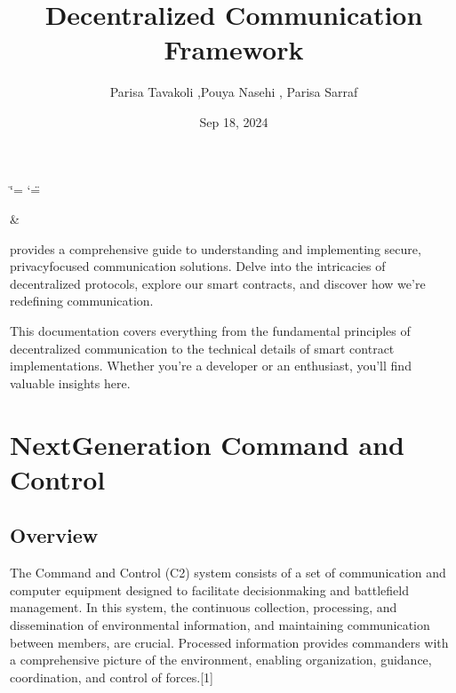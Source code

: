 \documentclass[a4paper,10pt,english]{sphinxmanual}
\title{Decentralized Communication Framework}
\date{Sep 18, 2024}
\author{Parisa Tavakoli ,Pouya Nasehi , Parisa Sarraf}
\begin{document}
\ifdefined\shorthandoff
  \ifnum\catcode`\=\string=\active\shorthandoff{=}\fi
  \ifnum\catcode`\"=\active{}\fi
\fi

\pagestyle{empty}
\sphinxmaketitle
\pagestyle{plain}
\sphinxtableofcontents
\pagestyle{normal}
\label{\detokenize{index::doc}}



\begin{savenotes}\sphinxattablestart
\sphinxthistablewithglobalstyle
\centering
\begin{tabular}[t]{}
\sphinxtoprule
\sphinxtableatstartofbodyhook
\noindent{}
&
\noindent{}
\\
\sphinxbottomrule
\end{tabular}
\sphinxtableafterendhook\par
\sphinxattableend\end{savenotes}

\sphinxAtStartPar
{}

\sphinxAtStartPar
{} provides a comprehensive guide to understanding and implementing secure, privacy\sphinxhyphen{}focused communication solutions. Delve into the intricacies of decentralized protocols, explore our smart contracts, and discover how we’re redefining communication.

\sphinxAtStartPar
{} This documentation covers everything from the fundamental principles of decentralized communication to the technical details of smart contract implementations. Whether you’re a developer or an enthusiast, you’ll find valuable insights here.

\sphinxstepscope


\chapter{Next\sphinxhyphen{}Generation Command and Control}
\label{\detokenize{overview:next-generation-command-and-control}}\label{\detokenize{overview::doc}}

\section{Overview}
\label{\detokenize{overview:overview}}
\sphinxAtStartPar
The Command and Control (C2) system consists of a set of communication and computer equipment designed to facilitate decision\sphinxhyphen{}making and battlefield management. In this system, the continuous collection, processing, and dissemination of environmental information, and maintaining communication between members, are crucial. Processed information provides commanders with a comprehensive picture of the environment, enabling organization, guidance, coordination, and control of forces.{[}1{]}
\end{document}
